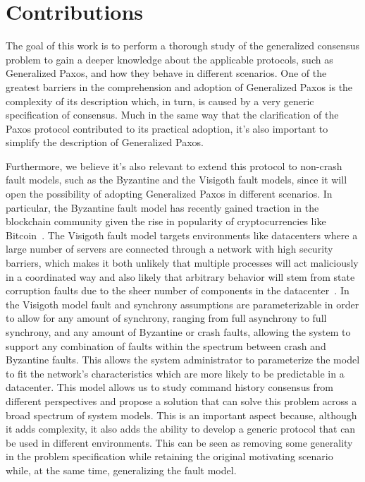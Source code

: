 \section{Contributions}
The goal of this work is to perform a thorough study of the generalized consensus problem to gain a deeper knowledge about the applicable protocols, such as Generalized Paxos, and how they behave in different scenarios. One of the greatest barriers in the comprehension and adoption of Generalized Paxos is the complexity of its description which, in turn, is caused by a very generic specification of consensus. Much in the same way that the clarification of the Paxos protocol contributed to its practical adoption, it's also important to simplify the description of Generalized Paxos. \par
Furthermore, we believe it's also relevant to extend this protocol to non-crash fault models, such as the Byzantine and the Visigoth fault models, since it will open the possibility of adopting Generalized Paxos in different scenarios. In particular, the Byzantine fault model has recently gained traction in the blockchain community given the rise in popularity of cryptocurrencies like Bitcoin~\cite{bitcoin}. The Visigoth fault model targets environments like datacenters where a large number of servers are connected through a network with high security barriers, which makes it both unlikely that multiple processes will act maliciously in a coordinated way and also likely that arbitrary behavior will stem from state corruption faults due to the sheer number of components in the datacenter~\cite{Porto2015}. In the Visigoth model fault and synchrony assumptions are parameterizable in order to allow for any amount of synchrony, ranging from full asynchrony to full synchrony, and any amount of Byzantine or crash faults, allowing the system to support any combination of faults within the spectrum between crash and Byzantine faults. This allows the system administrator to parameterize the model to fit the network's characteristics which are more likely to be predictable in a datacenter. This model allows us to study command history consensus from different perspectives and propose a solution that can solve this problem across a broad spectrum of system models. This is an important aspect because, although it adds complexity, it also adds the ability to develop a generic protocol that can be used in different environments. This can be seen as removing some generality in the problem specification while retaining the original motivating scenario while, at the same time, generalizing the fault model.
